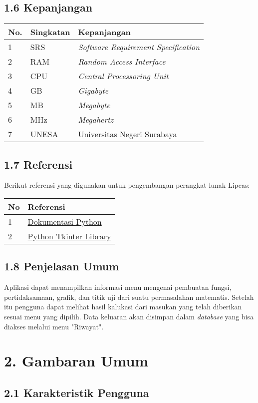 \documentclass[a4paper]{article}
\begin{document}
    \subsection*{1.6 Kepanjangan}
    \begin{tabular}{ | m{1em}| m{} | m{} | }
        \hline
        \textbf{No.} & \textbf{Singkatan}   & \textbf{Kepanjangan}\\
        \hline
        1 & SRS & \textit{Software Requirement Specification}\\
        \hline
        2 & RAM & \textit{Random Access Interface}\\
        \hline
        3 & CPU & \textit{Central Processoring Unit}\\
        \hline
        4 & GB & \textit{Gigabyte}\\
        \hline
        5 & MB & \textit{Megabyte}\\
        \hline
        6 & MHz & \textit{Megahertz}\\
        \hline
        7 & UNESA & Universitas Negeri Surabaya \\
        \hline
    \end{tabular}
    \subsection*{1.7 Referensi}
    \noindent Berikut referensi yang digunakan untuk pengembangan perangkat
    lunak Lipcas:

    \vspace*{10pt}
    \begin{tabular}{ | m{1em}| m{} | }
       \hline 
       \textbf{No} & \textbf{Referensi}\\
       \hline
       1 & \href{https://wiki.python.org/moin/BeginnersGuide}{Dokumentasi Python} \\
       \hline
       2 & \href{https://docs.python.org/3/library/tk.html}{Python Tkinter Library}\\
       \hline
    \end{tabular}

    \subsection*{1.8 Penjelasan Umum}
    \noindent Aplikasi dapat menampilkan informasi menu mengenai
    pembuatan fungsi, pertidaksamaan, grafik, dan titik uji
    dari suatu permasalahan matematis. Setelah itu pengguna 
    dapat melihat hasil kalukasi dari masukan yang telah diberikan
    sesuai menu yang dipilih. Data keluaran akan disimpan dalam
    \textit{database} yang bisa diakses melalui menu "Riwayat".

\section*{2. Gambaran Umum}
    \subsection*{2.1 Karakteristik Pengguna}
    
\end{document}
